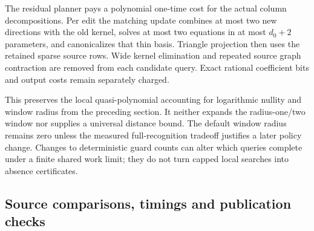 The residual planner pays a polynomial one-time cost for the actual column
decompositions. Per edit the matching update combines at most two new
directions with the old kernel, solves at most two equations in at most
$d_0+2$ parameters, and canonicalizes that thin basis. Triangle projection
then uses the retained sparse source rows. Wide kernel elimination and
repeated source graph contraction are removed from each candidate query.
Exact rational coefficient bits and output costs remain separately charged.

This preserves the local quasi-polynomial accounting for logarithmic
nullity and window radius from the preceding section. It neither expands
the radius-one/two window nor supplies a universal distance bound. The
default window radius remains zero unless the measured full-recognition
tradeoff justifies a later policy change. Changes to deterministic guard
counts can alter which queries complete under a finite shared work limit;
they do not turn capped local searches into absence certificates.

\subsection{Source comparisons, timings and publication checks}

